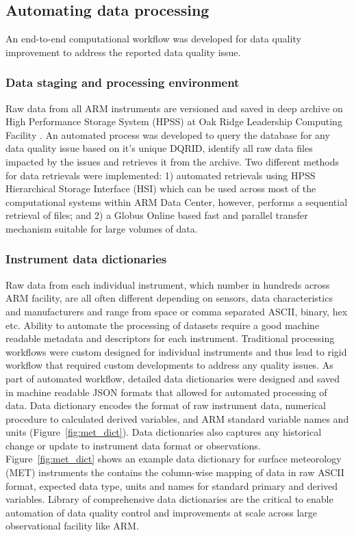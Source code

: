 \subsection{Automating data processing}
An end-to-end computational workflow was developed for data quality
improvement to address the reported data quality issue.

\subsubsection{Data staging and processing environment}
Raw data from all ARM instruments are versioned and saved in deep
archive on High Performance Storage System (HPSS) \cite{Watson_HSI_2005}
at Oak Ridge Leadership Computing Facility \cite{olcf_hpss}. An
automated process was developed to query the database for any data
quality issue based on it's unique DQRID, identify all raw data files
impacted by the issues and retrieves it from the archive. Two different
methods for data retrievals were implemented: 1) automated retrievals
using HPSS Hierarchical Storage Interface (HSI) \cite{Watson_HSI_2005}
which can be used across
most of the computational systems within ARM Data Center, however,
performs a sequential retrieval of files; and 2) a Globus Online
\cite{Foster_Globus_2011,Allen_SSD_2012} based
fast and parallel transfer mechanism suitable for large volumes of data.  

\subsubsection{Instrument data dictionaries}
Raw data from each individual instrument, which number in hundreds across
ARM facility, are all often different depending on sensors, data
characteristics and manufacturers and range from space or comma
separated ASCII, binary, hex etc. Ability to automate the processing of
datasets require a good machine readable metadata and descriptors for
each instrument. Traditional processing workflows were custom
designed for individual instruments and thus lead to rigid workflow that
required custom developments to address any quality issues. As part of
automated workflow, detailed data dictionaries were designed and saved
in machine readable JSON formats that allowed for automated processing
of data. Data dictionary encodes the format of raw instrument data,
numerical procedure to calculated derived variables, and ARM standard
variable names and units (Figure~\ref{fig:met_dict}). Data dictionaries
also captures any historical change or update to instrument data format
or observations. Figure~\ref{fig:met_dict} shows an example data
dictionary for surface meteorology (MET) instruments the contains the
column-wise mapping of data in raw ASCII format, expected data type,
units and names for standard primary and derived variables.
Library of comprehensive data dictionaries are the
critical to enable automation of data quality control and improvements
at scale across large observational facility like ARM. 

